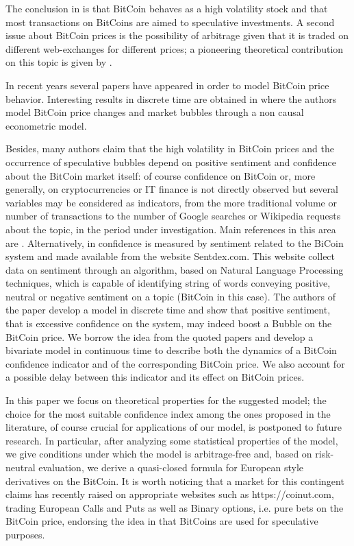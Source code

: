 \documentclass[12pt,centertags,reqno]{amsart}
\numberwithin{equation}{section} \makeatletter
\begin{document}
The conclusion in  \citet{Yermack} is that BitCoin behaves as a high volatility stock and that most transactions on BitCoins are aimed to speculative investments. A second issue about BitCoin prices is the possibility of arbitrage given that it is traded on different web-exchanges for different prices; a pioneering theoretical contribution on this topic is given by \citet{doi:10.1080/14697688.2016.1231928}.

In recent years several papers have appeared in order to model BitCoin price behavior. Interesting results in discrete time are obtained in \citet{HencGou} where the authors  model BitCoin price changes and market bubbles through a non causal econometric model. 

Besides, many authors claim that the high volatility in BitCoin prices and the occurrence of speculative bubbles depend on positive sentiment and confidence about the BitCoin market itself: of course confidence on BitCoin or, more generally, on cryptocurrencies or IT finance is not directly observed  but several variables may be considered as indicators, from the more traditional volume or number of transactions to the number of Google searches or Wikipedia requests about the topic, in the period under investigation. Main references in this area are \citet{MainDrivers, GoogleTrends, SentimentAnalysis}. Alternatively, in \citet{bukovina2016sentiment} confidence is measured by sentiment related to the BiCoin system and made available from the website Sentdex.com. This website collect data on sentiment through an algorithm, based on Natural Language Processing techniques,  which is capable of identifying string of words conveying positive, neutral or negative sentiment on a topic (BitCoin in this case). The authors of the paper develop a model in discrete time and show that positive sentiment, that is excessive confidence on the system, may indeed boost a Bubble on the BitCoin price.   
We borrow the idea from the quoted papers and develop a bivariate model in continuous time to describe both the dynamics of a BitCoin confidence indicator and of the corresponding BitCoin price. We also account for a possible delay between this indicator and its effect on BitCoin prices. 

In this paper we focus on theoretical properties for the suggested model; the choice for the most suitable confidence index among the ones proposed in the literature, of course crucial for applications of our model, is postponed to future research.
In particular, after analyzing some statistical properties of the model, we give conditions under which the model is arbitrage-free and, based on risk-neutral evaluation, we derive a quasi-closed formula for European style derivatives on the BitCoin.
It is worth noticing that a market for this contingent claims has recently raised on appropriate websites such as  https://coinut.com,  trading European Calls and Puts as well as Binary options, i.e. pure bets on the BitCoin price, endorsing the idea in \citet{Yermack} that BitCoins are used for speculative purposes.
\end{document}
